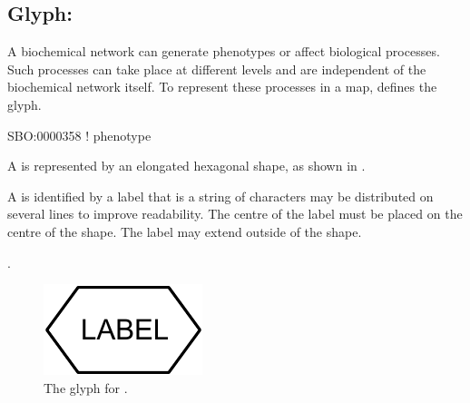 \subsection{Glyph: }
\label{sec:phenotype}

A biochemical network can generate phenotypes or affect biological processes.
Such processes can take place at different levels and are independent of the biochemical network itself.
To represent these processes in a map, \PD defines the  glyph.

\begin{glyphDescription}

\glyphSboTerm
SBO:0000358 ! phenotype



\glyphContainer
A  is represented by an elongated hexagonal shape, as shown in .

\glyphLabel
A  is identified by a label that is  a string of characters  may be distributed on several lines to improve readability.
The centre of the label must be placed on the centre of the shape.
The label may extend outside of the shape.

\glyphAux 
{}.

\end{glyphDescription}

\begin{figure}[H]
  \centering
  \includegraphics{images/phenotype}
  \caption{The \PD glyph for .}
  \label{fig:phenotype}
\end{figure}

